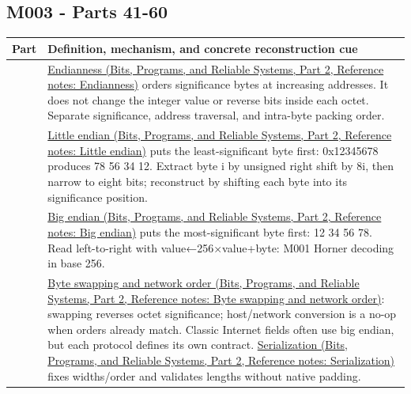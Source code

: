 \subsection{M003 - Parts 41-60}\label{appendix-fd090d982a15-m003---parts-41-60}

\hypertarget{appendix-fd090d982a15-m003---parts-41-60}{}

{\def\LTcaptype{none} %
\begin{longtable}[]{@{}
  >{\raggedright\arraybackslash}p{}
  >{\raggedright\arraybackslash}p{}@{}}
\toprule\noalign{}
\begin{minipage}[b]{\linewidth}\raggedright
Part
\end{minipage} & \begin{minipage}[b]{\linewidth}\raggedright
Definition, mechanism, and concrete reconstruction cue
\end{minipage} \\
\midrule\noalign{}
\endhead
\bottomrule\noalign{}
\endlastfoot
41 & \href{../01-Bits-Programs-and-Reliable-Systems-P02/main.pdf\#nameddest=appendix-bc07c3d25b18}{Endianness (Bits, Programs, and Reliable Systems, Part 2, Reference notes: Endianness)} orders significance bytes at increasing addresses. It does not change the integer value or reverse bits inside each octet. Separate significance, address traversal, and intra-byte packing order. \\
42 & \href{../01-Bits-Programs-and-Reliable-Systems-P02/main.pdf\#nameddest=appendix-367b6abf460e}{Little endian (Bits, Programs, and Reliable Systems, Part 2, Reference notes: Little endian)} puts the least-significant byte first: 0x12345678 produces 78 56 34 12. Extract byte i by unsigned right shift by 8i, then narrow to eight bits; reconstruct by shifting each byte into its significance position. \\
43 & \href{../01-Bits-Programs-and-Reliable-Systems-P02/main.pdf\#nameddest=appendix-92e040df969a}{Big endian (Bits, Programs, and Reliable Systems, Part 2, Reference notes: Big endian)} puts the most-significant byte first: 12 34 56 78. Read left-to-right with value←256×value+byte: M001 Horner decoding in base 256. \\
44 & \href{../01-Bits-Programs-and-Reliable-Systems-P02/main.pdf\#nameddest=appendix-11ba36693aa2}{Byte swapping and network order (Bits, Programs, and Reliable Systems, Part 2, Reference notes: Byte swapping and network order)}: swapping reverses octet significance; host/network conversion is a no-op when orders already match. Classic Internet fields often use big endian, but each protocol defines its own contract. \href{../01-Bits-Programs-and-Reliable-Systems-P02/main.pdf\#nameddest=appendix-91d09ebed979}{Serialization (Bits, Programs, and Reliable Systems, Part 2, Reference notes: Serialization)} fixes widths/order and validates lengths without native padding. \\

\end{longtable}}
